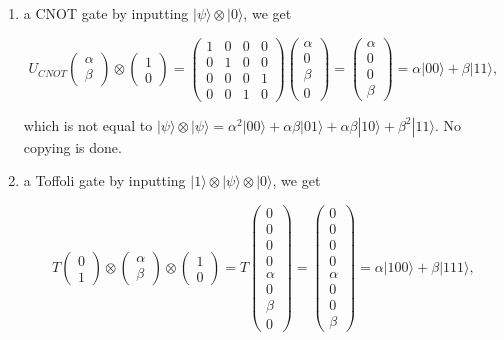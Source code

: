 \documentclass{article}
\theoremstyle{definition}
\begin{document}
    \begin{enumerate}
      \item a CNOT gate by inputting $|\psi \rangle \otimes |0\rangle$, we get

        \[U_{CNOT} \begin{pmatrix} \alpha \\ \beta \end{pmatrix} \otimes \begin{pmatrix} 1 \\ 0 \end{pmatrix} = \begin{pmatrix} 1&0&0&0\\0&1&0&0\\0&0&0&1\\0&0&1&0 \end{pmatrix} \begin{pmatrix} \alpha \\ 0 \\ \beta \\ 0 \end{pmatrix} = \begin{pmatrix} \alpha \\ 0 \\ 0 \\ \beta \end{pmatrix} = \alpha |00\rangle + \beta |11\rangle,\]

      which is not equal to $|\psi \rangle \otimes |\psi \rangle = \alpha^2 |00\rangle + \alpha \beta |01 \rangle + \alpha \beta |10 \rangle + \beta^2 |11 \rangle$. No copying is done.

      \item a Toffoli gate by inputting $|1\rangle \otimes |\psi \rangle \otimes |0\rangle$, we get

        \[T \begin{pmatrix} 0 \\ 1 \end{pmatrix} \otimes \begin{pmatrix} \alpha \\ \beta \end{pmatrix} \otimes \begin{pmatrix} 1 \\ 0 \end{pmatrix} = T \begin{pmatrix} 0\\0\\0\\0\\ \alpha \\ 0 \\ \beta \\ 0 \end{pmatrix} = \begin{pmatrix} 0\\0\\0\\0\\ \alpha \\ 0 \\ 0 \\ \beta \end{pmatrix} = \alpha |100\rangle + \beta |111\rangle,\]


\end{enumerate}
\end{document}
